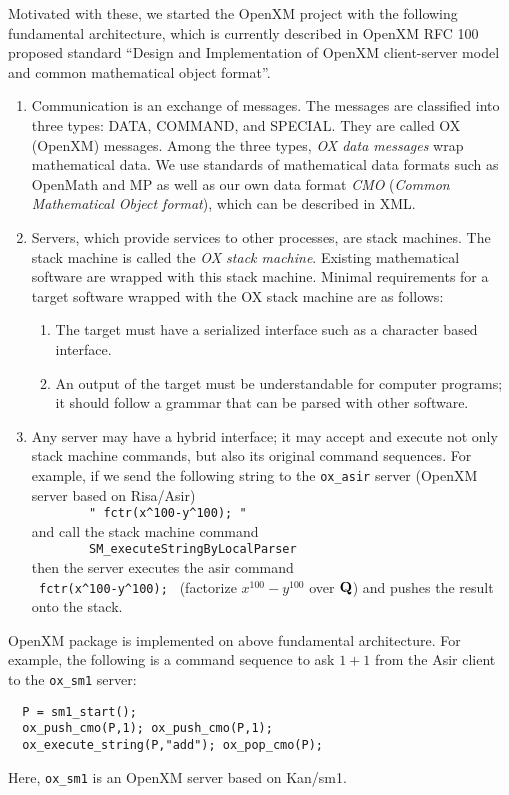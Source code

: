 Motivated with these, we started the OpenXM project with the following
fundamental architecture, which is currently described in
OpenXM RFC 100  proposed standard %
``Design and Implementation of OpenXM client-server model and common
mathematical object format''.
\begin{enumerate}
\item Communication is an exchange of messages. The messages are classified into
three types:
DATA, COMMAND, and SPECIAL.
They are called OX (OpenXM) messages.
Among the three types,
{\it OX data messages} wrap mathematical data.
We use standards of mathematical data formats such as OpenMath and MP
as well as our own data format {\it CMO}
({\it Common Mathematical Object format}),
which can be described in XML.
\item Servers, which provide services to other processes, are stack machines.
The stack machine is called the
{\it OX stack machine}.
Existing mathematical software are wrapped with this stack machine.
Minimal requirements for a target software wrapped with the OX stack machine
are as follows:
\begin{enumerate}
\item The target must have a serialized interface such as a character based
interface.
\item An output of the target must be understandable for computer programs;
it should follow a grammar that can be parsed with other software.
\end{enumerate}
\item Any server may have a hybrid interface;
it may accept and execute not only stack machine commands, 
but also its original command sequences.
For example,
if we send the following string to the {\tt ox\_asir} server 
(OpenXM server based on Risa/Asir) \\
\verb+        " fctr(x^100-y^100); "      + \\
and call the stack machine command  \\
\verb+        SM_executeStringByLocalParser    + \\ 
then the server executes the asir command \\
\verb+ fctr(x^100-y^100); + 
(factorize $x^{100}-y^{100}$ over ${\bf Q}$)
and pushes the result onto the stack.
\end{enumerate}
OpenXM package  is implemented on above fundamental architecture.
For example, the following is a command sequence to ask $1+1$ from
the Asir client to the {\tt ox\_sm1} server:
\begin{verbatim}
  P = sm1_start();
  ox_push_cmo(P,1); ox_push_cmo(P,1);
  ox_execute_string(P,"add"); ox_pop_cmo(P);
\end{verbatim}
Here, {\tt ox\_sm1} is an OpenXM server based on Kan/sm1.


